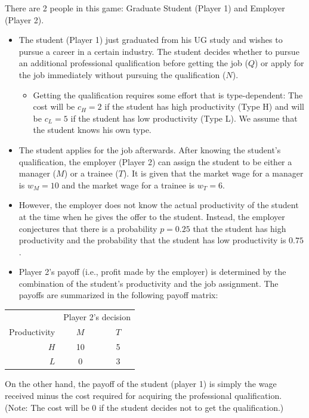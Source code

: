 \documentclass[twoside]{article}
\theoremstyle{definitionstyle}
\begin{document}
There are 2 people in this game: Graduate Student (Player 1) and Employer (Player 2).
\begin{itemize}
    \item The student (Player 1) just graduated from his UG study and wishes to pursue a career in a certain industry. The student decides whether to pursue an additional professional qualification before getting the job ($Q$) or apply for the job immediately without pursuing the qualification ($N$).
    \begin{itemize}
        \item Getting the qualification requires some effort that is type-dependent: The cost will be $c_H = 2$ if the student has high productivity (Type H) and will be $c_L = 5$ if the student has low productivity (Type L). We assume that the student knows his own type.
    \end{itemize}
    \item The student applies for the job afterwards. After knowing the student’s qualification, the employer (Player 2) can assign the student to be either a manager ($M$) or a trainee ($T$). It is given that the market wage for a manager is $w_M = 10$ and the market wage for a trainee is $w_T = 6$.
    \item However, the employer does not know the actual productivity of the student at the time when he gives the offer to the student. Instead, the employer conjectures that there is a probability $p = 0.25$ that the student has high productivity and the probability that the student has low productivity is $0.75$.
    \item Player 2’s payoff (i.e., profit made by the employer) is determined by the combination of the student's productivity and the job assignment. The payoffs are summarized in the following payoff matrix:
\end{itemize}

\begin{center}
\begin{tabular}{r|cc}
    \multicolumn{1}{c}{} & \multicolumn{2}{c}{Player 2's decision} \\
    Productivity & $M$ & $T$ \\ \hline
    $H$ & 10 & 5 \\
    $L$ & 0 & 3
\end{tabular}
\end{center}

On the other hand, the payoff of the student (player 1) is simply the wage received minus the cost required for acquiring the professional qualification. (Note: The cost will be 0 if the student decides not to get the qualification.)
\end{document}
